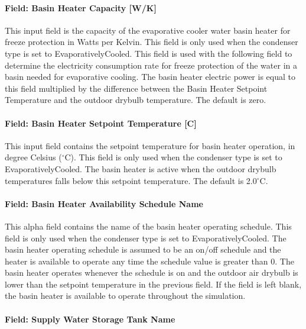 \paragraph{Field: Basin Heater Capacity {[}W/K{]}}\label{field-basin-heater-capacity-wk}

This input field is the capacity of the evaporative cooler water basin heater for freeze protection in Watts per Kelvin. This field is only used when the condenser type is set to EvaporativelyCooled. This field is used with the following field to determine the electricity consumption rate for freeze protection of the water in a basin needed for evaporative cooling. The basin heater electric power is equal to this field multiplied by the difference between the Basin Heater Setpoint Temperature and the outdoor drybulb temperature. The default is zero.

\paragraph{Field: Basin Heater Setpoint Temperature {[}C{]}}\label{field-basin-heater-setpoint-temperature-c}

This input field contains the setpoint temperature for basin heater operation, in degree Celsius ($^\circ$C). This field is only used when the condenser type is set to EvaporativelyCooled. The basin heater is active when the outdoor drybulb temperatures falls below this setpoint temperature. The default is 2.0$^\circ$C.

\paragraph{Field: Basin Heater Availability Schedule Name}\label{field-basin-heater-availability-schedule-name}

This alpha field contains the name of the basin heater operating schedule. This field is only used when the condenser type is set to EvaporativelyCooled. The basin heater operating schedule is assumed to be an on/off schedule and the heater is available to operate any time the schedule value is greater than 0. The basin heater operates whenever the schedule is on and the outdoor air drybulb is lower than the setpoint temperature in the previous field. If the field is left blank, the basin heater is available to operate throughout the simulation.

\paragraph{Field: Supply Water Storage Tank Name}\label{field-supply-water-storage-tank-name-5-000}

